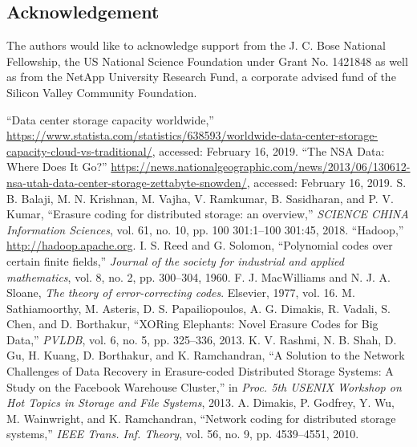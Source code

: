 \begin{multicols}{2}
\section{Acknowledgement}
The authors would like to acknowledge support from the J. C. Bose National Fellowship, the US National Science
Foundation under Grant No. 1421848 as well as from the NetApp University Research Fund, a corporate advised fund of the Silicon Valley Community Foundation.

\begin{thebibliography}{99}
 ``Data center storage capacity worldwide,'' \url{https://www.statista.com/statistics/638593/worldwide-data-center-storage-capacity-cloud-vs-traditional/}, accessed: February 16, 2019. 
 ``The NSA Data: Where Does It Go?'' \url{https://news.nationalgeographic.com/news/2013/06/130612-nsa-utah-data-center-storage-zettabyte-snowden/}, accessed: February 16, 2019.
 S. B. Balaji, M. N. Krishnan, M. Vajha, V. Ramkumar, B. Sasidharan, and P. V. Kumar, ``Erasure coding for distributed storage: an overview,'' \textit{SCIENCE CHINA Information Sciences}, vol. 61, no. 10, pp. 100 301:1--100 301:45, 2018.
 ``Hadoop,'' \url{http://hadoop.apache.org}.
 I. S. Reed and G. Solomon, ``Polynomial codes over certain finite fields,'' \textit{Journal of the society for industrial and applied mathematics}, vol. 8, no. 2, pp. 300--304, 1960.
 F. J. MacWilliams and N. J. A. Sloane, \textit{The theory of error-correcting codes}. Elsevier, 1977, vol. 16.
 M. Sathiamoorthy, M. Asteris, D. S. Papailiopoulos, A. G. Dimakis, R. Vadali, S. Chen, and D. Borthakur, ``XORing Elephants: Novel Erasure Codes for Big Data,'' \textit{PVLDB}, vol. 6, no. 5, pp. 325--336, 2013.
 K. V. Rashmi, N. B. Shah, D. Gu, H. Kuang, D. Borthakur, and K. Ramchandran, ``A Solution to the Network Challenges of Data Recovery in Erasure-coded Distributed Storage Systems: A Study on the Facebook Warehouse Cluster,'' in \textit{Proc. 5th USENIX Workshop on Hot Topics in Storage and File Systems}, 2013.
 A. Dimakis, P. Godfrey, Y. Wu, M. Wainwright, and K. Ramchandran, ``Network coding for distributed storage systems,'' \textit{IEEE Trans. Inf. Theory}, vol. 56, no. 9, pp. 4539--4551, 2010.

\end{thebibliography}
\end{multicols}
